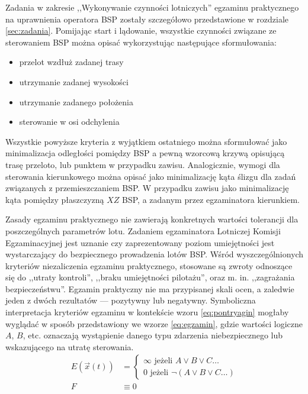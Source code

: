 Zadania w zakresie ,,Wykonywanie czynności lotniczych'' egzaminu praktycznego na uprawnienia operatora BSP zostały szczegółowo przedstawione w rozdziale \ref{sec:zadania}. Pomijając start i lądowanie, wszystkie czynności związane ze sterowaniem BSP można opisać wykorzystując następujące sformułowania:
\begin{itemize}
    \item przelot wzdłuż zadanej trasy
    \item utrzymanie zadanej wysokości
    \item utrzymanie zadanego położenia
    \item sterowanie w osi odchylenia
\end{itemize}
Wszystkie powyższe kryteria z wyjątkiem ostatniego można sformułować jako minimalizacja odległości pomiędzy BSP a pewną wzorcową krzywą opisującą trasę przeloto, lub punktem w przypadku zawisu. Analogicznie, wymogi dla sterowania kierunkowego można opisać jako minimalizację kąta ślizgu dla zadań związanych z przemieszczaniem BSP. W przypadku zawisu jako minimalizację kąta pomiędzy płaszczyzną $ XZ $ BSP, a zadanym przez egzaminatora kierunkiem.

Zasady egzaminu praktycznego nie zawierają konkretnych wartości tolerancji dla poszczególnych parametrów lotu. Zadaniem egzaminatora Lotniczej Komisji Egzaminacyjnej jest uznanie czy zaprezentowany poziom umiejętności jest wystarczający do bezpiecznego prowadzenia lotów BSP. Wśród wyszczególnionych kryteriów niezaliczenia egzaminu praktycznego, stosowane są zwroty odnoszące się do ,,utraty kontroli'', ,,braku umiejętności pilotażu'', oraz m. in. ,,zagrażania bezpieczeństwu''. Egzamin praktyczny nie ma przypisanej skali ocen, a zaledwie jeden z dwóch rezultatów --- pozytywny lub negatywny. Symboliczna interpretacja kryteriów egzaminu w kontekście wzoru \ref{eq:pontryagin} mogłaby wyglądać w sposób przedstawiony we wzorze \ref{eq:egzamin}, gdzie wartości logiczne $ A $, $ B $, etc. oznaczają wystąpienie danego typu zdarzenia niebezpiecznego lub wskazującego na utratę sterowania.
\begin{align}
    \label{eq:egzamin}
    E\left( \vec{x}(t) \right) &=
    \left\{
        \begin{array}{ll}
            \infty \mbox{ jeżeli } A \lor B \lor C \dots \\
            0 \mbox{ jeżeli } \neg ( A \lor B \lor C \dots)
        \end{array}
    \right.
    \\
    F & \equiv 0
\end{align}

